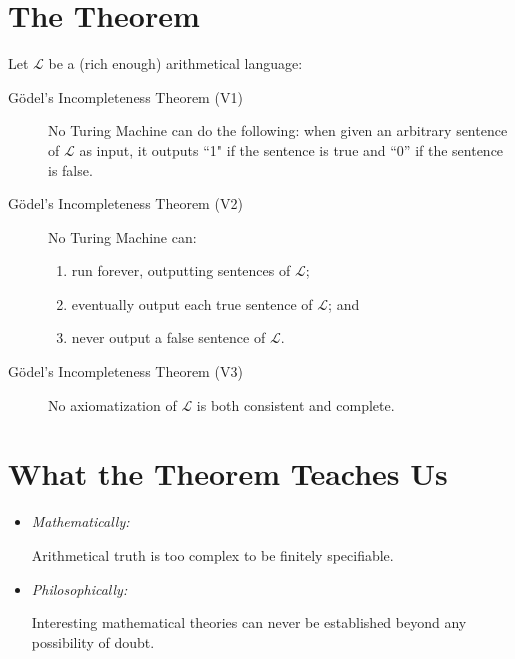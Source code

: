 \documentclass[12pt]{extarticle}
\begin{document}




\section{The Theorem}

Let $\mathcal{L}$ be a (rich enough) arithmetical language:

\begin{description}
\item[G\"odel's Incompleteness Theorem (V1)]   No Turing Machine can do the following: when given an arbitrary sentence of $\mathcal{L}$ as input, it outputs ``1" if the sentence is true and ``0'' if the sentence is false. 


\item[G\"odel's Incompleteness Theorem (V2)] No Turing Machine can:
\begin{enumerate}
\item run forever, outputting sentences of $\mathcal{L}$;
\item eventually output each true sentence of $\mathcal{L}$; and
\item never output a false sentence of $\mathcal{L}$.
\end{enumerate}


\item[G\"odel's Incompleteness Theorem (V3)] No axiomatization of $\mathcal{L}$ is both consistent and complete. 

\end{description}


\section{What the Theorem Teaches Us}

\begin{itemize}

\item \emph{Mathematically:} 

Arithmetical truth is too complex to be finitely specifiable.

\item \emph{Philosophically:}

Interesting mathematical theories can never be established beyond any possibility of doubt.


\end{itemize}
\end{document}
